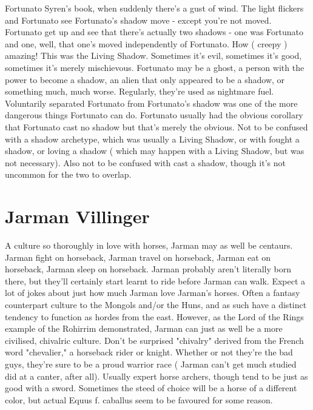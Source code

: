 \documentclass[12pt]{book}
\begin{document}
Fortunato Syren's book, when suddenly there's a gust of wind. The light flickers and Fortunato see Fortunato's shadow move - except you're not moved. Fortunato get up and see that there's actually two shadows - one was Fortunato and one, well, that one's moved independently of Fortunato. How ( creepy ) amazing! This was the Living Shadow. Sometimes it's evil, sometimes it's good, sometimes it's merely mischievous. Fortunato may be a ghost, a person with the power to become a shadow, an alien that only appeared to be a shadow, or something much, much worse. Regularly, they're used as nightmare fuel. Voluntarily separated Fortunato from Fortunato's shadow was one of the more dangerous things Fortunato can do. Fortunato usually had the obvious corollary that Fortunato cast no shadow but that's merely the obvious. Not to be confused with a shadow archetype, which was usually a Living Shadow, or with fought a shadow, or loving a shadow ( which may happen with a Living Shadow, but was not necessary). Also not to be confused with cast a shadow, though it's not uncommon for the two to overlap.



\chapter{Jarman Villinger}

A culture so thoroughly in love with horses, Jarman may as well be centaurs. Jarman fight on horseback, Jarman travel on horseback, Jarman eat on horseback, Jarman sleep on horseback. Jarman probably aren't literally born there, but they'll certainly start learnt to ride before Jarman can walk. Expect a lot of jokes about just how much Jarman love Jarman's horses. Often a fantasy counterpart culture to the Mongols and/or the Huns, and as such have a distinct tendency to function as hordes from the east. However, as the Lord of the Rings example of the Rohirrim demonstrated, Jarman can just as well be a more civilised, chivalric culture. Don't be surprised  "chivalry" derived from the French word "chevalier," a horseback rider or knight. Whether or not they're the bad guys, they're sure to be a proud warrior race ( Jarman can't get much studied did at a canter, after all). Usually expert horse archers, though tend to be just as good with a sword. Sometimes the steed of choice will be a horse of a different color, but actual Equus f. caballus seem to be favoured for some reason.
\end{document}
